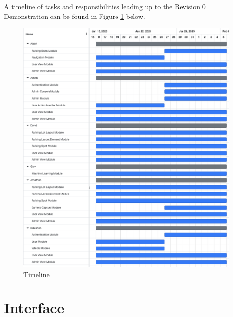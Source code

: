 \documentclass[12pt, titlepage]{article}
\begin{document}
A timeline of tasks and responsibilities leading up to the Revision 0
Demonstration can be found in Figure \ref{fig:timeline} below.

\begin{figure}[h]
    \begin{center}
        \includegraphics[scale=0.6]{timeline.png}
        \caption{Timeline}
        \label{fig:timeline}
    \end{center}
\end{figure}


\newpage{}

\appendix
\section{Interface}
\end{document}
